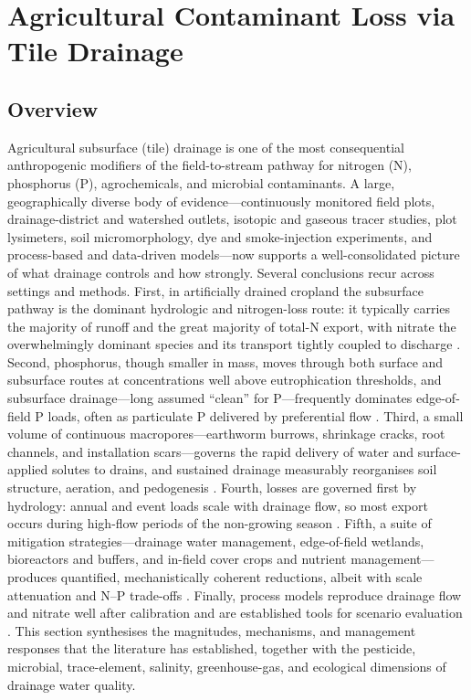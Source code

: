 \documentclass[11pt]{article}
\begin{document}
\section*{Agricultural Contaminant Loss via Tile Drainage}

\subsection{Overview}

Agricultural subsurface (tile) drainage is one of the most consequential
anthropogenic modifiers of the field-to-stream pathway for nitrogen (N),
phosphorus (P), agrochemicals, and microbial contaminants. A large,
geographically diverse body of evidence---continuously monitored field
plots, drainage-district and watershed outlets, isotopic and gaseous
tracer studies, plot lysimeters, soil micromorphology, dye and
smoke-injection experiments, and process-based and data-driven
models---now supports a well-consolidated picture of what drainage
controls and how strongly. Several conclusions recur across settings and
methods. First, in artificially drained cropland the subsurface pathway is
the dominant hydrologic and nitrogen-loss route: it typically carries the
majority of runoff and the great majority of total-N export, with nitrate
the overwhelmingly dominant species and its transport tightly coupled to
discharge \parencite{Bechmann2014,Raymond2012,Williams2015,Grose2022}.
Second, phosphorus, though smaller in mass, moves through both surface and
subsurface routes at concentrations well above eutrophication thresholds,
and subsurface drainage---long assumed ``clean'' for P---frequently
dominates edge-of-field P loads, often as particulate P delivered by
preferential flow \parencite{Pease2018,VanEsbroeck2016,Uusitalo2001,Laubel1999}.
Third, a small volume of continuous macropores---earthworm burrows,
shrinkage cracks, root channels, and installation scars---governs the rapid
delivery of water and surface-applied solutes to drains, and sustained
drainage measurably reorganises soil structure, aeration, and pedogenesis
\parencite{Shipitalo2004,Villholth1998,Montagne2008}. Fourth, losses are
governed first by hydrology: annual and event loads scale with drainage
flow, so most export occurs during high-flow periods of the non-growing
season \parencite{Kladivko2021,Ikenberry2014,King2016}. Fifth, a suite of
mitigation strategies---drainage water management, edge-of-field wetlands,
bioreactors and buffers, and in-field cover crops and nutrient
management---produces quantified, mechanistically coherent reductions,
albeit with scale attenuation and N--P trade-offs
\parencite{Skaggs2010,Wu2025,Tanner2005,Jaynes2008,Hanrahan2018}. Finally,
process models reproduce drainage flow and nitrate well after calibration
and are established tools for scenario evaluation
\parencite{Youssef2018,Negm2014,Moriasi2013}. This section synthesises the
magnitudes, mechanisms, and management responses that the literature has
established, together with the pesticide, microbial, trace-element,
salinity, greenhouse-gas, and ecological dimensions of drainage water
quality.
\end{document}
